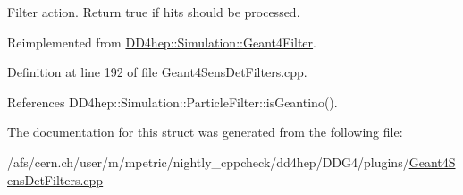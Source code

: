 Filter action. Return true if hits should be processed. 



Reimplemented from \hyperlink{class_d_d4hep_1_1_simulation_1_1_geant4_filter_a373f84ddcbefe180daa058050b6cf753}{D\+D4hep\+::\+Simulation\+::\+Geant4\+Filter}.



Definition at line 192 of file Geant4\+Sens\+Det\+Filters.\+cpp.



References D\+D4hep\+::\+Simulation\+::\+Particle\+Filter\+::is\+Geantino().



The documentation for this struct was generated from the following file\+:\begin{DoxyCompactItemize}
\item 
/afs/cern.\+ch/user/m/mpetric/nightly\+\_\+cppcheck/dd4hep/\+D\+D\+G4/plugins/\hyperlink{_geant4_sens_det_filters_8cpp}{Geant4\+Sens\+Det\+Filters.\+cpp}\end{DoxyCompactItemize}
